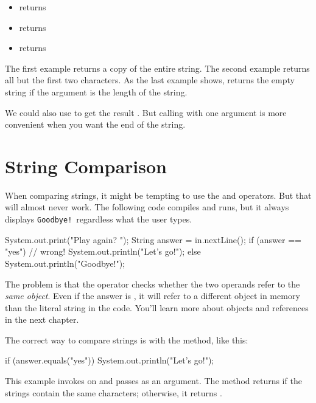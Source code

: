 \begin{itemize}
\item {} returns 
\item {} returns 
\item {} returns 
\end{itemize}

The first example returns a copy of the entire string.
The second example returns all but the first two characters.
As the last example shows,  returns the empty string if the argument is the length of the string.

We could also use  to get the result .
But calling  with one argument is more convenient when you want the end of the string.


\section{String Comparison}
\label{strcmp}


When comparing strings, it might be tempting to use the \java{==} and \java{!=} operators.
But that will almost never work.
The following code compiles and runs, but it always displays {\tt Goodbye!}\ regardless what the user types.

\begin{code}
System.out.print("Play again? ");
String answer = in.nextLine();
if (answer == "yes") {                 // wrong!
    System.out.println("Let's go!");
} else {
    System.out.println("Goodbye!");
}
\end{code}

The problem is that the \java{==} operator checks whether the two operands refer to the {\em same object}.
Even if the answer is , it will refer to a different object in memory than the literal string  in the code.
You'll learn more about objects and references in the next chapter.

The correct way to compare strings is with the  method, like this:

\begin{code}
if (answer.equals("yes")) {
    System.out.println("Let's go!");
}
\end{code}

This example invokes  on  and passes  as an argument.
The  method returns  if the strings contain the same characters; otherwise, it returns .

